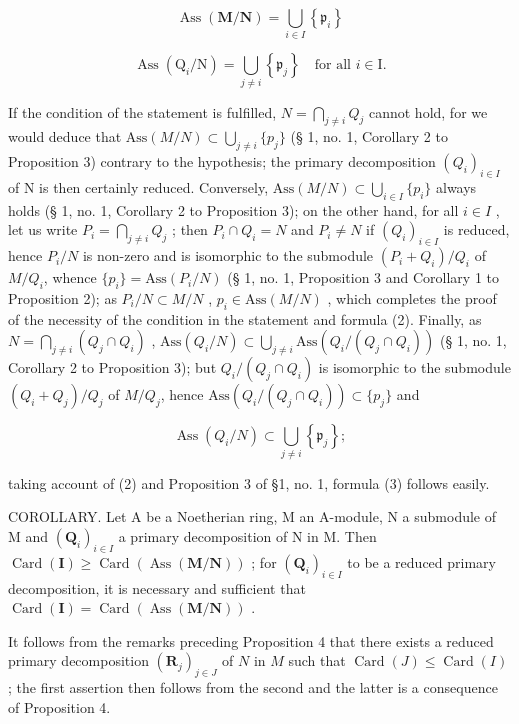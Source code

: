 \[
\operatorname{Ass} (\mathbf {M} / \mathbf {N}) = \bigcup_ {i \in I} \left\{\mathfrak {p} _ {i} \right\}\tag{3}
\]

\[
\operatorname{Ass} \left(\mathrm{Q} _ {i} / \mathrm{N}\right) = \bigcup_ {j \neq i} \left\{\mathfrak {p} _ {j} \right\} \quad \text{for all } i \in \mathrm{I}.
\]

If the condition of the statement is fulfilled, \(N = \bigcap_{j \neq i} Q_j\) cannot hold, for we would deduce that \(\text{Ass}(M/N) \subset \bigcup_{j \neq i} \{p_j\}\) (§ 1, no. 1, Corollary 2 to Proposition 3) contrary to the hypothesis; the primary decomposition \((Q_i)_{i \in I}\) of N is then certainly reduced. Conversely, \(\text{Ass}(M/N) \subset \bigcup_{i \in I} \{p_i\}\) always holds (§ 1, no. 1, Corollary 2 to Proposition 3); on the other hand, for all \(i \in I\) , let us write \(P_i = \bigcap_{j \neq i} Q_j\) ; then \(P_i \cap Q_i = N\) and \(P_i \neq N\) if \((Q_i)_{i \in I}\) is reduced, hence \(P_i/N\) is non-zero and is isomorphic to the submodule \((P_i + Q_i)/Q_i\) of \(M/Q_i\), whence \(\{p_i\} = \text{Ass}(P_i/N)\) (§ 1, no. 1, Proposition 3 and Corollary 1 to Proposition 2); as \(P_i/N \subset M/N\) , \(p_i \in \text{Ass}(M/N)\) , which completes the proof of the necessity of the condition in the statement and formula (2). Finally, as \(N = \bigcap_{j \neq i} (Q_j \cap Q_i)\) , \(\text{Ass}(Q_i/N) \subset \bigcup_{j \neq i} \text{Ass}(Q_i/(Q_j \cap Q_i))\) (§ 1, no. 1, Corollary 2 to Proposition 3); but \(Q_i/(Q_j \cap Q_i)\) is isomorphic to the submodule \((Q_i + Q_j)/Q_j\) of \(M/Q_j\), hence \(\text{Ass}(Q_i/(Q_j \cap Q_i)) \subset \{p_j\}\) and

\[
\operatorname{Ass} \left(Q _ {i} / N\right) \subset \bigcup_ {j \neq i} \left\{\mathfrak {p} _ {j} \right\};
\]

taking account of (2) and Proposition 3 of §1, no. 1, formula (3) follows easily.

COROLLARY. Let A be a Noetherian ring, M an A-module, N a submodule of M and \((\mathbf{Q}_{i})_{i\in I}\) a primary decomposition of N in M. Then \(\operatorname{Card}(\mathbf{I}) \geqslant \operatorname{Card}(\operatorname{Ass}(\mathbf{M}/\mathbf{N}))\) ; for \((\mathbf{Q}_{i})_{i\in I}\) to be a reduced primary decomposition, it is necessary and sufficient that \(\operatorname{Card}(\mathbf{I}) = \operatorname{Card}(\operatorname{Ass}(\mathbf{M}/\mathbf{N}))\) .

It follows from the remarks preceding Proposition 4 that there exists a reduced primary decomposition \((\mathbf{R}_j)_{j\in J}\) of \(N\) in \(M\) such that \(\operatorname{Card}(J) \leqslant \operatorname{Card}(I)\) ; the first assertion then follows from the second and the latter is a consequence of Proposition 4.

